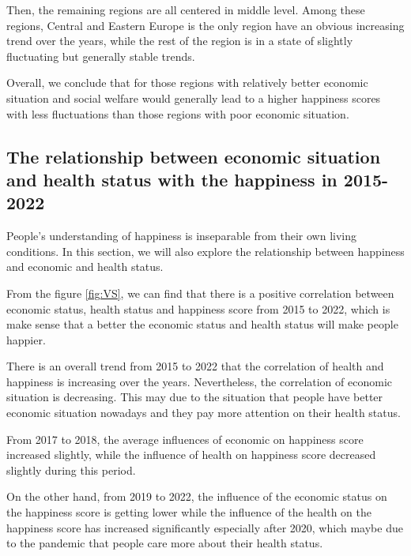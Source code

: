 \documentclass[11pt,a4paper,]{article}
\begin{document}
Then, the remaining regions are all centered in middle level. Among these regions, Central and Eastern Europe is the only region have an obvious increasing trend over the years, while the rest of the region is in a state of slightly fluctuating but generally stable trends.

Overall, we conclude that for those regions with relatively better economic situation and social welfare would generally lead to a higher happiness scores with less fluctuations than those regions with poor economic situation.

\hypertarget{the-relationship-between-economic-situation-and-health-status-with-the-happiness-in-2015-2022}{%
\subsection{The relationship between economic situation and health status with the happiness in 2015-2022}\label{the-relationship-between-economic-situation-and-health-status-with-the-happiness-in-2015-2022}}

People's understanding of happiness is inseparable from their own living conditions. In this section, we will also explore the relationship between happiness and economic and health status.

From the figure \ref{fig:VS}, we can find that there is a positive correlation between economic status, health status and happiness score from 2015 to 2022, which is make sense that a better the economic status and health status will make people happier.

There is an overall trend from 2015 to 2022 that the correlation of health and happiness is increasing over the years. Nevertheless, the correlation of economic situation is decreasing. This may due to the situation that people have better economic situation nowadays and they pay more attention on their health status.

From 2017 to 2018, the average influences of economic on happiness score increased slightly, while the influence of health on happiness score decreased slightly during this period.

On the other hand, from 2019 to 2022, the influence of the economic status on the happiness score is getting lower while the influence of the health on the happiness score has increased significantly especially after 2020, which maybe due to the pandemic that people care more about their health status.
\end{document}
